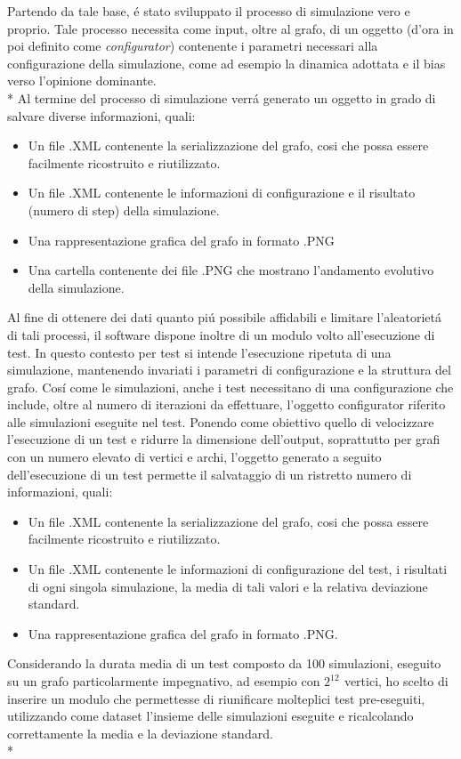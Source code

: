 \documentclass[../Tesi.tex]{subfiles}
\begin{document}
Partendo da tale base, \'e stato sviluppato il processo di simulazione vero e proprio. Tale processo necessita come input, oltre al grafo, di un oggetto (d'ora in poi definito come \emph{configurator}) contenente i parametri necessari alla configurazione della simulazione, come ad esempio la dinamica adottata e il bias verso l'opinione dominante.\\* 
Al termine del processo di simulazione verr\'a generato un oggetto in grado di salvare diverse informazioni, quali:
\begin{itemize}
\item Un file .XML contenente la serializzazione del grafo, cosi che possa essere facilmente ricostruito e riutilizzato.
\item Un file .XML contenente le informazioni di configurazione e il risultato (numero di step) della simulazione.
\item Una rappresentazione grafica del grafo in formato .PNG
\item Una cartella contenente dei file .PNG che mostrano l'andamento evolutivo della simulazione.
\end{itemize}
Al fine di ottenere dei dati quanto pi\'u possibile affidabili e limitare l'aleatoriet\'a di tali processi, il software dispone inoltre di un modulo volto all'esecuzione di test. In questo contesto per test si intende l'esecuzione ripetuta di una simulazione, mantenendo invariati i parametri di configurazione e la struttura del grafo. Cos\'i come le simulazioni, anche i test necessitano di una configurazione che include, oltre al numero di iterazioni da effettuare, l'oggetto configurator riferito alle simulazioni eseguite nel test.
Ponendo come obiettivo quello di velocizzare l'esecuzione di un test e ridurre la dimensione dell'output, soprattutto per grafi con un numero elevato di vertici e archi, l'oggetto generato a seguito dell'esecuzione di un test permette il salvataggio di un ristretto numero di informazioni, quali:
\begin{itemize}
\item Un file .XML contenente la serializzazione del grafo, cosi che possa essere facilmente ricostruito e riutilizzato.
\item Un file .XML contenente le informazioni di configurazione del test, i risultati di ogni singola simulazione, la media di tali valori e la relativa deviazione standard.
\item Una rappresentazione grafica del grafo in formato .PNG.
\end{itemize}
Considerando la durata media di un test composto da 100 simulazioni, eseguito su un grafo particolarmente impegnativo, ad esempio con $2^{12^{\mathrm{}}}$ vertici, ho scelto di inserire un modulo che permettesse di riunificare molteplici test pre-eseguiti, utilizzando come dataset l'insieme delle simulazioni eseguite e ricalcolando correttamente la media e la deviazione standard.\\*
\end{document}
